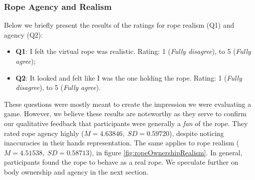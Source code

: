 \subsubsection{Rope Agency and Realism}
\label{subsubsection:ropeOwnRealism}
%               

Below we briefly present the results of the ratings for rope realism (Q1) and agency (Q2):
\begin{itemize}
\itemsep0em
\item \textbf{Q1}: I felt the virtual rope was realistic. Rating: 1 (\textit{Fully disagree}), to 5 (\textit{Fully agree});
\item \textbf{Q2}: It looked and felt like I was the one holding the rope. Rating: 1 (\textit{Fully disagree}), to 5 (\textit{Fully agree}).
\end{itemize}
These questions were mostly meant to create the impression we were evaluating a game. However, we believe these results are noteworthy as they serve to confirm our qualitative feedback that participants were generally a \textit{fan} of the rope. They rated rope agency highly 
($M=4.63846, \; SD=0.59720$), despite noticing inaccuracies in their hands representation. The same applies to rope realism ($M=4.51538, \; SD=0.58713$), in figure \ref{fig:ropeOwnershipRealism}. In general, participants found the rope to behave as a real rope. We speculate further on body ownership and agency in the next section.

